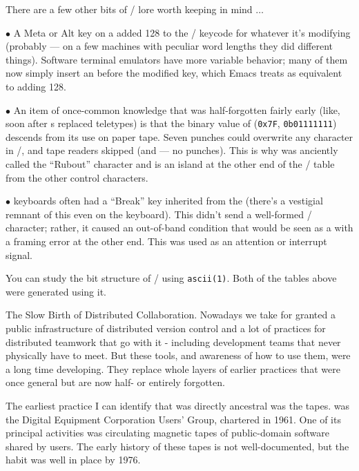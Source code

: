 There are a few other bits of \ASCII/ lore worth keeping in mind $\ldots$
{\medbreak\narrower
\item{$\bullet$} A Meta or Alt key on a  added 128 to the \ASCII/ keycode for
whatever it's modifying (probably --- on a few machines with peculiar word
lengths they did different things). Software terminal emulators have more
variable behavior; many of them now simply insert an  before the modified
key, which Emacs treats as equivalent to adding 128.

\item{$\bullet$} An item of once-common knowledge that was half-forgotten fairly early (like,
soon after s replaced teletypes) is that the binary value of  ({\tt 0x7F},
{\tt 0b01111111}) descends from its use on paper tape. Seven punches could overwrite
any character in \ASCII/, and tape readers skipped  (and  --- no punches).
This is why  was anciently called the ``Rubout'' character and is an island at
the other end of the \ASCII/ table from the other control characters.

\item{$\bullet$}  keyboards often had a ``Break'' key inherited from the  (there's a
vestigial remnant of this even on the  keyboard). This didn't send a
well-formed \ASCII/ character; rather, it caused an out-of-band condition that
would be seen as a  with a framing error at the other end. This was used as
an attention or interrupt signal.
\medbreak}
\noindent You can study the bit structure of \ASCII/ using {\tt ascii(1)}. Both of the tables
above were generated using it.

\sect The Slow Birth of Distributed Collaboration.
Nowadays we take for granted a public infrastructure of distributed version
control and a lot of practices for distributed teamwork that go with it -
including development teams that never physically have to meet. But these
tools, and awareness of how to use them, were a long time developing. They
replace whole layers of earlier practices that were once general but are now
half- or entirely forgotten.

The earliest practice I can identify that was directly ancestral was the 
tapes.  was the Digital Equipment Corporation Users' Group, chartered in
1961. One of its principal activities was circulating magnetic tapes of
public-domain software shared by  users. The early history of these tapes is
not well-documented, but the habit was well in place by 1976.

